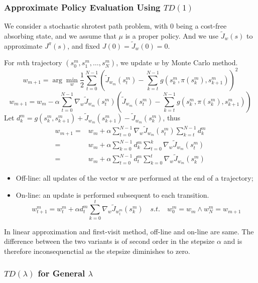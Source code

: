 \subsubsection{Approximate Policy Evaluation Using $ TD(1) $}%

We consider a stochastic shrotest path problem, with 0 being a cost-free absorbing state, and we assume that $ \mu $ is a proper policy. And we use $ \tilde J_{w}(s) $ to approximate $ J^{\pi}(s) $, and fixed $ J(0) = \tilde J_{w}(0) = 0 $.

For $ m $th trajectory $ (s^m_0, s^m_1, \ldots, s^m_N) $, we update $ w $ by Monte Carlo method.
\[
    w_{m+1} = \arg\min_{w} \frac{1}{2} \sum^{N-1}_{t=0} {\left( \tilde J_{w_m}(s^m_t) - \sum^{N-1}_{k=t} g(s^m_k, \pi(s^m_k), s^m_{k+1}) \right)}^2
\]
\[
    w_{m+1} = w_m - \alpha\sum^{N-1}_{t=0} \nabla_{w} \tilde J_{w_m}(s^m_t) \left( \tilde J_{w_m}(s^m_t) - \sum^{N-1}_{k=t} g(s^m_k, \pi(s^m_k), s^m_{k+1})  \right)
\]
Let $ d^m_k = g(s^m_k,s^m_{k+1}) + \tilde J_{w_m}(s^m_{k+1}) - \tilde J_{w_m}(s^m_k) $, thus
\begin{align*}
    w_{m+1} =& w_m + \alpha \sum^{N-1}_{t=0} \nabla_{w} \tilde J_{w_m}(s^m_t) \sum^{N-1}_{k=t} d^m_k\\
    =& w_m + \alpha \sum^{N-1}_{k=0} d^m_{k} \sum^{k}_{t = 0} \nabla_{w} \tilde J_{w_m}(s^m_t)\\
    =& w_m + \alpha \sum^{N-1}_{t = 0} d^m_{t} \sum^{t}_{k=0} \nabla_w \tilde J_{w_m}(s^{m}_k)
\end{align*}

\begin{itemize}
    \item Off-line: all updates of the vector w are performed at the end of a trajectory;
    \item On-line: an update is performed subsequent to each transition.
        \[
            w^m_{t+1} = w^m_{t} + \alpha d^m_t \sum^{t}_{k=0} \nabla_w \tilde J_{w^m_t}(s^m_k)
            \quad {s.t.}\quad w^m_{0} = w_m \wedge w^m_{N} = w_{m+1}
        \]
        
\end{itemize}
In linear approximation and first-visit method, off-line and on-line are same.
The difference between the two variants is of second order in the stepsize $ \alpha $ and is therefore inconsequenctial as the stepsize diminishes to zero.

\subsubsection{$ TD(\lambda) $ for General $ \lambda $}%

